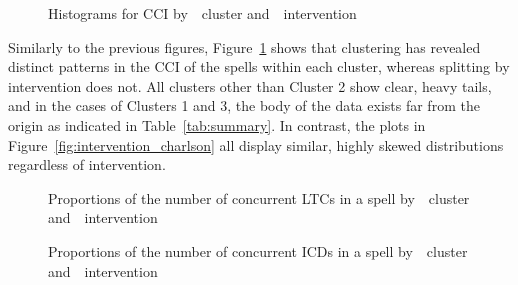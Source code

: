 \documentclass[]{interact}
\newlength{\imgwidth}
\theoremstyle{plain}%
\theoremstyle{definition}
\theoremstyle{remark}
\begin{document}
\begin{figure}
    \centering

    \caption{%
        Histograms for CCI by~~cluster
        and~~intervention
    }\label{fig:charlson}
\end{figure}

Similarly to the previous figures, Figure~\ref{fig:charlson} shows that
clustering has revealed distinct patterns in the CCI of the spells within each
cluster, whereas splitting by intervention does not. All clusters other than
Cluster 2 show clear, heavy tails, and in the cases of Clusters 1 and 3, the
body of the data exists far from the origin as indicated in
Table~\ref{tab:summary}. In contrast, the plots in
Figure~\ref{fig:intervention_charlson} all display similar, highly skewed
distributions regardless of intervention.

\begin{figure}
    \centering

    \caption{%
        Proportions of the number of concurrent LTCs in a spell
        by~~cluster
        and~~intervention
    }\label{fig:ltcs}
\end{figure}

\begin{figure}
    \centering

    \caption{%
        Proportions of the number of concurrent ICDs in a spell
        by~~cluster
        and~~intervention
    }\label{fig:icds}
\end{figure}
\end{document}
